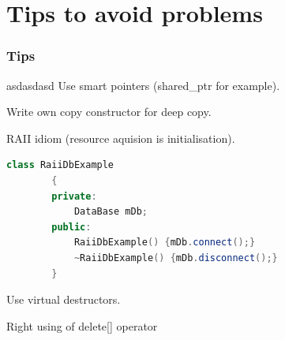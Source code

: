\documentclass[10pt,xcolor={usenames,dvipsnames}]{beamer}
\begin{document}
\section{Tips to avoid problems}
\begin{frame}[fragile]
	\frametitle{Tips}
	\begin{center}
		\begin{exampleblock}{asdasdasd }
			Use smart pointers (shared\_ptr for example).
		\end{exampleblock}

		\begin{exampleblock}{}
			Write own copy constructor for deep copy.
		\end{exampleblock}
		\begin{exampleblock}{}
			RAII idiom (resource aquision is initialisation).
		\begin{lstlisting}[language=C++]
		class RaiiDbExample
		{
		private:
			DataBase mDb;
		public:
			RaiiDbExample() {mDb.connect();}
			~RaiiDbExample() {mDb.disconnect();}
		}

		\end{lstlisting}

		\end{exampleblock}
		\begin{exampleblock}{}
			Use virtual destructors.
		\end{exampleblock}
		\begin{exampleblock}{}
		Right using of delete[] operator
		\end{exampleblock}
	\end{center}
\end{frame}
\end{document}

